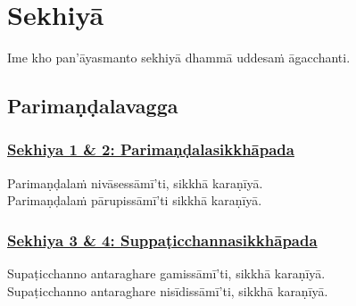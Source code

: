 
\section{Sekhiyā}
\label{sekh}

\begin{intro}
	Ime kho pan'āyasmanto sekhiyā\makeatletter\hyperlink{endnote469-appendix}\makeatother{} dhammā uddesaṁ āgacchanti.
\end{intro}

\setsubsecheadstyle{\subsectionFmt}
\subsection{Parimaṇḍalavagga}
\label{sekh-vagga1}

\subsubsection*{\hyperref[training1-2]{Sekhiya 1 \& 2: Parimaṇḍalasikkhāpada}}
\label{sekh1-2}

Parimaṇḍalaṁ nivāsessāmī'ti,\makeatletter\hyperlink{endnote470-appendix}\makeatother{} sikkhā karaṇīyā.\makeatletter\hyperlink{endnote471-appendix}\makeatother{}\\
Parimaṇḍalaṁ pārupissāmī'ti sikkhā karaṇīyā.



\subsubsection*{\hyperref[training3-4]{Sekhiya 3 \& 4: Suppaṭicchannasikkhāpada}}
\label{sekh3-4}

Supaṭicchanno\makeatletter\hyperlink{endnote472-appendix}\makeatother{} antaraghare gamissāmī'ti, sikkhā karaṇīyā.\\
Supaṭicchanno antaraghare nisīdissāmī'ti, sikkhā karaṇīyā.



